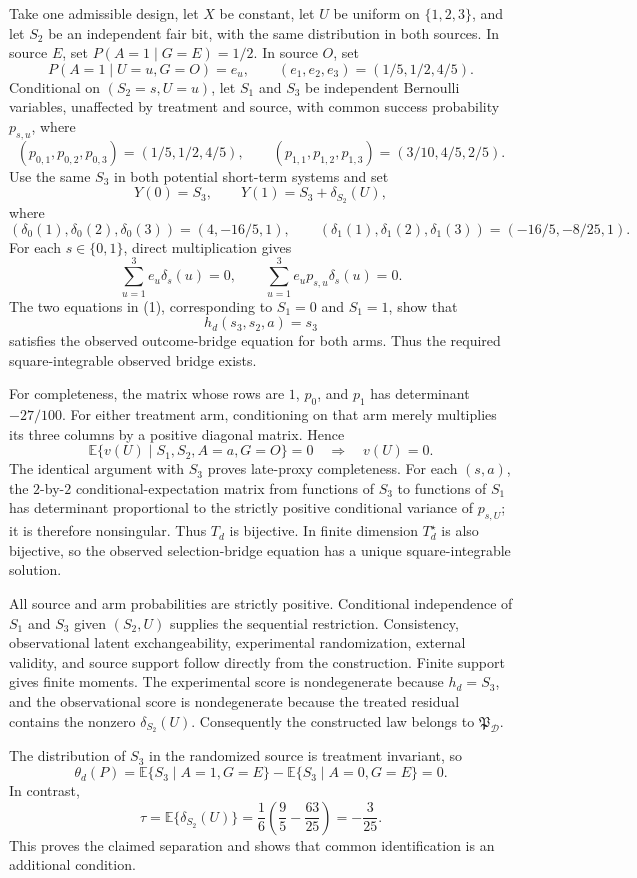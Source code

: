 Take one admissible design, let \(X\) be constant, let \(U\) be uniform on \(\{1,2,3\}\), and let \(S_2\) be an independent fair bit, with the same distribution in both sources. In source \(E\), set \(P(A=1\mid G=E)=1/2\). In source \(O\), set
\[
 P(A=1\mid U=u,G=O)=e_u,\qquad (e_1,e_2,e_3)=(1/5,1/2,4/5).
\]
Conditional on \((S_2=s,U=u)\), let \(S_1\) and \(S_3\) be independent Bernoulli variables, unaffected by treatment and source, with common success probability \(p_{s,u}\), where
\[
 (p_{0,1},p_{0,2},p_{0,3})=(1/5,1/2,4/5),\qquad
 (p_{1,1},p_{1,2},p_{1,3})=(3/10,4/5,2/5).
\]
Use the same \(S_3\) in both potential short-term systems and set
\[
 Y(0)=S_3,\qquad Y(1)=S_3+\delta_{S_2}(U),
\]
where
\[
 (\delta_0(1),\delta_0(2),\delta_0(3))=(4,-16/5,1),\qquad
 (\delta_1(1),\delta_1(2),\delta_1(3))=(-16/5,-8/25,1).
\]
For each \(s\in\{0,1\}\), direct multiplication gives
\[
 \sum_{u=1}^3 e_u\delta_s(u)=0,
 \qquad
 \sum_{u=1}^3 e_up_{s,u}\delta_s(u)=0.                 \tag{1}
\]
The two equations in (1), corresponding to \(S_1=0\) and \(S_1=1\), show that
\[
 h_d(s_3,s_2,a)=s_3
\]
satisfies the observed outcome-bridge equation for both arms. Thus the required square-integrable observed bridge exists.

For completeness, the matrix whose rows are \(1\), \(p_0\), and \(p_1\) has determinant \(-27/100\). For either treatment arm, conditioning on that arm merely multiplies its three columns by a positive diagonal matrix. Hence
\[
 \mathbb E\{v(U)\mid S_1,S_2,A=a,G=O\}=0
 \quad\Longrightarrow\quad v(U)=0.
\]
The identical argument with \(S_3\) proves late-proxy completeness. For each \((s,a)\), the \(2\)-by-\(2\) conditional-expectation matrix from functions of \(S_3\) to functions of \(S_1\) has determinant proportional to the strictly positive conditional variance of \(p_{s,U}\); it is therefore nonsingular. Thus \(T_d\) is bijective. In finite dimension \(T_d^\star\) is also bijective, so the observed selection-bridge equation has a unique square-integrable solution.

All source and arm probabilities are strictly positive. Conditional independence of \(S_1\) and \(S_3\) given \((S_2,U)\) supplies the sequential restriction. Consistency, observational latent exchangeability, experimental randomization, external validity, and source support follow directly from the construction. Finite support gives finite moments. The experimental score is nondegenerate because \(h_d=S_3\), and the observational score is nondegenerate because the treated residual contains the nonzero \(\delta_{S_2}(U)\). Consequently the constructed law belongs to \(\mathfrak P_{\mathcal D}\).

The distribution of \(S_3\) in the randomized source is treatment invariant, so
\[
 \theta_d(P)=
 \mathbb E\{S_3\mid A=1,G=E\}
 -\mathbb E\{S_3\mid A=0,G=E\}=0.
\]
In contrast,
\[
 \tau
 =\mathbb E\{\delta_{S_2}(U)\}
 =\frac16\left(\frac95-\frac{63}{25}\right)
 =-\frac3{25}.
\]
This proves the claimed separation and shows that common identification is an additional condition.